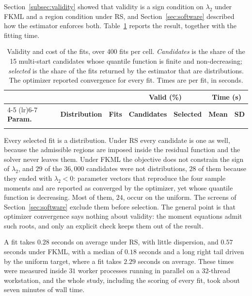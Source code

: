 Section~\ref{subsec:validity} showed that validity is a sign condition on
$\lambda_2$ under FKML and a region condition under RS, and
Section~\ref{sec:software} described how the estimator enforces both.
Table~\ref{tab:validity} reports the result, together with the fitting time.

\begin{table}[htbp]
\centering
\caption{Validity and cost of the fits, over 400 fits per cell.
\emph{Candidates} is the share of the 15 multi-start candidates whose quantile
function is finite and non-decreasing; \emph{selected} is the share of the fits
returned by the estimator that are distributions. The optimizer reported
convergence for every fit. Times are per fit, in seconds.}
\label{tab:validity}
\small
\begin{tabular}{llrrrrr}
\toprule
& & & \multicolumn{2}{c}{\textbf{Valid (\%)}} & \multicolumn{2}{c}{\textbf{Time (s)}} \\
\cmidrule(lr){4-5} \cmidrule(lr){6-7}
\textbf{Param.} & \textbf{Distribution} & \textbf{Fits} &
\textbf{Candidates} & \textbf{Selected} & \textbf{Mean} & \textbf{SD} \\
\midrule
\unskip \\
\bottomrule
\end{tabular}
\end{table}

Every selected fit is a distribution. Under RS every candidate is one as well,
because the admissible regions are imposed inside the residual function and the
solver never leaves them. Under FKML the objective does not constrain the sign of
$\lambda_2$, and $29$ of the $36{,}000$ candidates were not distributions, $28$ of
them because they ended with $\lambda_2 < 0$: parameter vectors that reproduce
the four sample moments and are reported as converged by the optimizer, yet whose
quantile function is decreasing. Most of them, $24$, occur on the uniform. The
screens of
Section~\ref{sec:software} exclude them before selection. The general point is
that optimizer convergence says nothing about validity: the moment equations
admit such roots, and only an explicit check keeps them out of the result.

A fit takes $0.28$ seconds on average under RS, with little dispersion, and
$0.57$ seconds under FKML, with a median of $0.18$ seconds and a long right tail
driven by the uniform target, where a fit takes $2.29$ seconds on average. These
times were measured inside $31$ worker processes running in parallel on a
$32$-thread workstation, and the whole study, including the scoring of every
fit, took about seven minutes of wall time.


